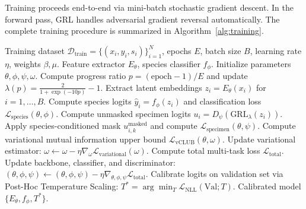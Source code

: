 \documentclass[a4paper,fleqn]{cas-sc}
\begin{document}
Training proceeds end-to-end via mini-batch stochastic gradient descent. In the forward pass, GRL handles adversarial gradient reversal automatically. The complete training procedure is summarized in Algorithm~\ref{alg:training}.

\begin{algorithm}[t]
\caption{Specimen-Invariant Timber Representation Learning}
\label{alg:training}
\begin{algorithmic}[1]
\Require Training dataset $\mathcal{D}_{\text{train}} = \{(x_i, y_i, s_i)\}_{i=1}^N$, epochs $E$, batch size $B$, learning rate $\eta$, weights $\beta, \mu$.
\Ensure Feature extractor $E_\theta$, species classifier $f_\phi$.
\State Initialize parameters $\theta, \phi, \psi, \omega$.
    \State Compute progress ratio $p = (\text{epoch}-1) / E$ and update $\lambda(p) = \frac{2}{1 + \exp(-10 p)} - 1$.
        \State Extract latent embeddings $z_i = E_\theta(x_i)$ for $i=1,\dots,B$.
        \State Compute species logits $\hat{y}_i = f_\phi(z_i)$ and classification loss $\mathcal{L}_{\text{species}}(\theta, \phi)$.
        \State Compute unmasked specimen logits $u_i = D_\psi(\text{GRL}_\lambda(z_i))$.
        \State Apply species-conditioned mask $u^{\text{masked}}_{i, k}$ and compute $\mathcal{L}_{\text{specimen}}(\theta, \psi)$.
        \State Compute variational mutual information upper bound $\mathcal{L}_{\text{vCLUB}}(\theta, \omega)$.
        \State Update variational estimator: $\omega \leftarrow \omega - \eta \nabla_\omega \mathcal{L}_{\text{variational}}(\omega)$.
        \State Compute total multi-task loss $\mathcal{L}_{\text{total}}$.
        \State Update backbone, classifier, and discriminator:
        \State $(\theta, \phi, \psi) \leftarrow (\theta, \phi, \psi) - \eta \nabla_{\theta, \phi, \psi} \mathcal{L}_{\text{total}}$.
    \EndFor
\EndFor
\State Calibrate logits on validation set via Post-Hoc Temperature Scaling: $T^* = \arg\min_T \mathcal{L}_{\text{NLL}}(\text{Val}; T)$.
\State \Return Calibrated model $\{E_\theta, f_\phi, T^*\}$.
\end{algorithmic}
\end{algorithm}
\end{document}
